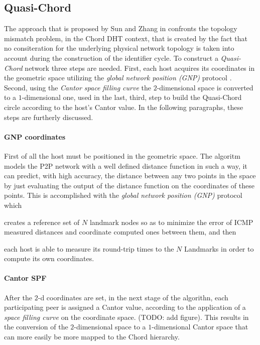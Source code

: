 \documentclass[a4paper,10pt]{article}
\begin{document}
\subsection{Quasi-Chord}
The approach that is proposed by Sun and Zhang in \cite{sun_quasi_2008} confronts the topology mismatch problem, in the Chord DHT context, that is created by the fact that no consiteration for the underlying physical network topology is taken into account during the construction of the identifier cycle. To construct a \emph{Quasi-Chord} network three steps are needed. First, each host acquires its coordinates in the geometric space utilizing the \emph{global network position (GNP)} protocol \cite{ng_gnp_2001}. Second, using the \emph{Cantor space filling curve} the $2$-dimensional space is converted to a $1$-dimensional one, used in the last, third, step to build the Quasi-Chord circle according to the host's Cantor value. In the following paragraphs, these steps are furtherly discussed.
\paragraph{GNP coordinates} First of all the host must be positioned in the geometric space. The algoritm models the P2P network with a well defined distance function in such a way, it can predict, with high accuracy, the distance between any two points in the space by just evaluating the output of the distance function on the coordinates of these points. This is accomplished with the \emph{global network position (GNP)} protocol which\begin{inparaenum}
  \item creates a reference set of $N$ landmark nodes so as to minimize the error of ICMP measured distances and coordinate computed ones between them, and then
  \item each host is able to measure its round-trip times to the $N$ Landmarks in order to compute its own coordinates.
\end{inparaenum}
\paragraph{Cantor SPF} After the $2$-d coordinates are set, in the next stage of the algorithn, each participating peer is assigned a Cantor value, according to the application of a \emph{space filling curve} on the coordinate space. (TODO: add figure). This results in the conversion of the $2$-dimensional space to a $1$-dimensional Cantor space that can more easily be more mapped to the Chord hierarchy.
\end{document}
